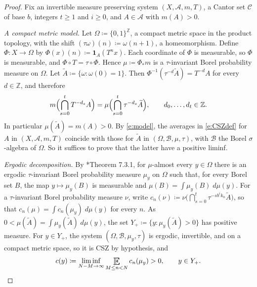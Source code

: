 \begin{proof}
Fix an invertible measure preserving system $(X,\mathcal A,m,T)$, a Cantor set $\mathcal C$ of base $b$, integers $t \geq 1$ and $i \geq 0$, and $A \in \mathcal A$ with $m(A)>0$.  

\emph{A compact metric model.}  Let $\Omega \coloneqq \{0,1\} ^{\mathbb Z}$, a compact metric space in the product topology, with the shift $(\tau\omega)(n) \coloneqq \omega(n+1)$, a homeomorphism.  
Define $\Phi \colon X \to \Omega$ by $\Phi(x)(n) \coloneqq \mathbf 1_A(T ^{n}x)$.  Each coordinate of $\Phi$ is measurable, so $\Phi$ is measurable, and $\Phi\circ T = \tau \circ \Phi$.  
Hence $\mu \coloneqq \Phi_\ast m$ is a $\tau$-invariant Borel probability measure on $\Omega$.  Let $\widetilde A \coloneqq \{\omega \colon \omega(0) = 1\}$.  
Then $\Phi ^{-1}(\tau ^{-d}\widetilde A) = T ^{-d}A$ for every $d \in \mathbb Z$, and therefore 
\begin{equation} \label{e:model}
m \Bigl( \bigcap_{s=0}^t T ^{-d_s}A \Bigr) = \mu \Bigl( \bigcap_{s=0}^t \tau ^{-d_s}\widetilde A \Bigr) , \qquad d_0 , \ldots, d_t \in \mathbb Z . 
\end{equation}
In particular $\mu(\widetilde A) = m(A)>0$.  By \eqref{e:model}, the averages in \eqref{e:CSZdef} for $A$ in $(X,\mathcal A,m,T)$ coincide with those for $\widetilde A$ in $(\Omega,\mathcal B,\mu,\tau)$, 
with $\mathcal B$ the Borel $\sigma$-algebra of $\Omega$.  So it suffices to prove that the latter have a positive liminf.  

\emph{Ergodic decomposition.}  By \cite{MoreiraNotes}*{Theorem 7.3.1}, for $\mu$-almost every $y \in \Omega$ there is an ergodic $\tau$-invariant Borel probability measure $\mu_y$ on $\Omega$ 
such that, for every Borel set $B$, the map $y \mapsto \mu_y(B)$ is measurable and $\mu(B) = \int \mu_y(B)\;d\mu(y)$.  
For a $\tau$-invariant Borel probability measure $\nu$, write 
$c_n(\nu) \coloneqq \nu \bigl( \bigcap_{s=0}^t \tau ^{-sb ^{i}k_n}\widetilde A \bigr)$, so that $c_n(\mu) = \int c_n(\mu_y)\;d\mu(y)$ for every $n$.  
As $0 < \mu(\widetilde A) = \int \mu_y(\widetilde A)\;d\mu(y)$, the set $Y_+ \coloneqq \{y \colon \mu_y(\widetilde A)>0\}$ has positive measure.  
For $y \in Y_+$, the system $(\Omega,\mathcal B,\mu_y,\tau)$ is ergodic, invertible, and on a compact metric space, so it is CSZ by hypothesis, and 
\begin{equation}
c(y) \coloneqq \liminf_{N-M\to\infty} \Expectation_{M\leq n<N} c_n(\mu_y) > 0 , \qquad y \in Y_+ . 
\end{equation}


\end{proof}
